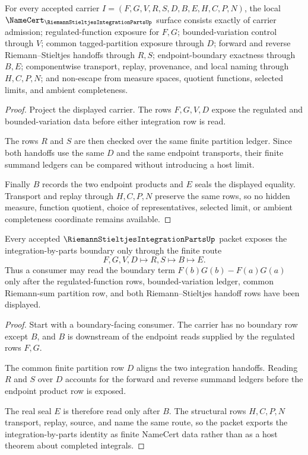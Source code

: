 \begin{theorem}
\label{thm:riemann-stieltjes-integration-parts-namecert-obligations}
For every accepted carrier $I=(F,G,V,R,S,D,B,E,H,C,P,N)$, the local $\NameCert_{\RiemannStieltjesIntegrationPartsUp}$ surface consists exactly of carrier admission; regulated-function exposure for $F,G$; bounded-variation control through $V$; common tagged-partition exposure through $D$; forward and reverse Riemann--Stieltjes handoffs through $R,S$; endpoint-boundary exactness through $B,E$; componentwise transport, replay, provenance, and local naming through $H,C,P,N$; and non-escape from measure spaces, quotient functions, selected limits, and ambient completeness.
\end{theorem}
\begin{proof}
Project the displayed carrier. The rows $F,G,V,D$ expose the regulated and bounded-variation data before either integration row is read.

The rows $R$ and $S$ are then checked over the same finite partition ledger. Since both handoffs use the same $D$ and the same endpoint transports, their finite summand ledgers can be compared without introducing a host limit.

Finally $B$ records the two endpoint products and $E$ seals the displayed equality. Transport and replay through $H,C,P,N$ preserve the same rows, so no hidden measure, function quotient, choice of representatives, selected limit, or ambient completeness coordinate remains available.
\end{proof}

\begin{theorem}
\label{thm:riemann-stieltjes-integration-parts-boundary}
Every accepted $\RiemannStieltjesIntegrationPartsUp$ packet exposes the integration-by-parts boundary only through the finite route
$$
F,G,V,D \longmapsto R,S \longmapsto B \longmapsto E .
$$
Thus a consumer may read the boundary term $F(b)G(b)-F(a)G(a)$ only after the regulated-function rows, bounded-variation ledger, common Riemann-sum partition row, and both Riemann--Stieltjes handoff rows have been displayed.
\end{theorem}
\begin{proof}
Start with a boundary-facing consumer. The carrier has no boundary row except $B$, and $B$ is downstream of the endpoint reads supplied by the regulated rows $F,G$.

The common finite partition row $D$ aligns the two integration handoffs. Reading $R$ and $S$ over $D$ accounts for the forward and reverse summand ledgers before the endpoint product row is exposed.

The real seal $E$ is therefore read only after $B$. The structural rows $H,C,P,N$ transport, replay, source, and name the same route, so the packet exports the integration-by-parts identity as finite NameCert data rather than as a host theorem about completed integrals.
\end{proof}

